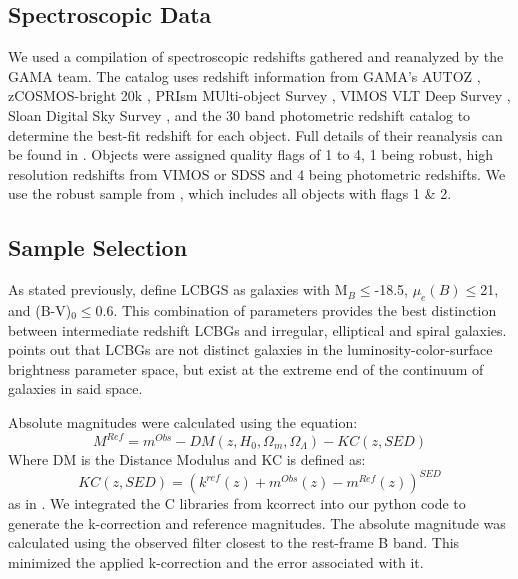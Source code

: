 \documentclass[manuscript]{aastex61}
\begin{document}
\subsection{Spectroscopic Data}
We used a compilation of spectroscopic redshifts gathered and reanalyzed by the GAMA team. The catalog uses redshift information from GAMA's AUTOZ \citep{2014MNRAS.441.2440B}, zCOSMOS-bright 20k \citep{2009ApJS..184..218L}, PRIsm MUlti-object Survey \citep{2011ApJ...741....8C,2013ApJ...767..118C}, VIMOS VLT Deep Survey \citep{2008A&A...486..683G}, Sloan Digital Sky Survey \citep{2014ApJS..211...17A}, and the 30 band photometric redshift catalog \citep{2009ApJ...690.1236I} to determine the best-fit redshift for each object. Full details of their reanalysis can be found in \citet{2015MNRAS.447.1014D}. Objects were assigned quality flags of 1 to 4, 1 being robust, high resolution redshifts from VIMOS or SDSS and 4 being photometric redshifts. We use the robust sample from \citet{2015MNRAS.447.1014D}, which includes all objects with flags 1 \& 2.

\subsection{Sample Selection}
As stated previously, \citet{2004ApJ...617.1004W} define LCBGS as galaxies with M$_{B}\leq$-18.5, $\mu_{e}(B)\leq$21, and (B-V)$_{0}\leq$0.6. This combination of parameters provides the best distinction between intermediate redshift LCBGs and irregular, elliptical and spiral galaxies. \citet{2004ApJ...617.1004W} points out that LCBGs are not distinct galaxies in  the luminosity-color-surface brightness parameter space, but exist at the extreme end of the continuum of galaxies in said space. 

Absolute magnitudes were calculated using the equation:
\begin{equation}
M^{Ref}=m^{Obs}-DM(z,H_{0},\Omega_{m},\Omega_{\Lambda})-KC(z,SED)
\label{eq:equation 1}
\end{equation}
Where DM is the Distance Modulus and KC is defined as:
\begin{equation}
KC(z,SED)=(k^{ref}(z)+m^{Obs}(z)-m^{Ref}(z))^{SED}
\label{eq:equation 2}
\end{equation}
as in \citet{2005A&A...439..863I}. We integrated the C libraries from kcorrect \citep{2007AJ....133..734B} into our python code to generate the k-correction and reference magnitudes. The absolute magnitude was calculated using the observed filter closest to the rest-frame B band. This minimized the applied k-correction and the error associated with it.
\end{document}
